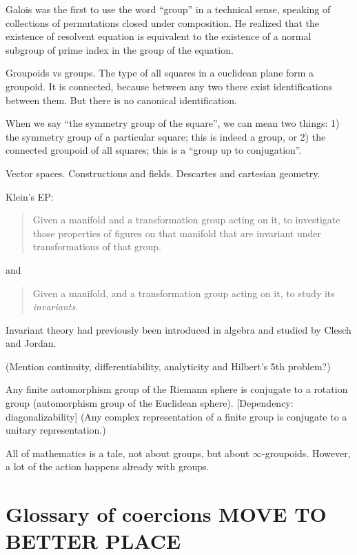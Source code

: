 Galois was the first to use the word ``group'' in a technical sense,
speaking of collections of permutations closed under composition.
He realized that the existence of resolvent equation is equivalent
to the existence of a normal subgroup of prime index
in the group of the equation.

Groupoids vs groups.
The type of all squares in a euclidean plane form a groupoid.
It is connected,
because between any two there exist identifications between them.
But there is no canonical identification.

When we say ``the symmetry group of the square'',
we can mean two things:
1) the symmetry group of a particular square;
this is indeed a group,
or 2) the connected groupoid of all squares;
this is a ``group up to conjugation''.

Vector spaces. Constructions and fields. Descartes and cartesian geometry.

Klein's EP:
\begin{quote}
  Given a manifold and a transformation group acting on it,
  to investigate those properties of figures on that manifold
  that are invariant under transformations of that group.
\end{quote}
and
\begin{quote}
  Given a manifold, and a transformation group acting on it,
  to study its \emph{invariants}.
\end{quote}
Invariant theory had previously been introduced in algebra
and studied by Clesch and Jordan.

(Mention continuity, differentiability, analyticity and Hilbert's 5th problem?)

Any finite automorphism group of the Riemann sphere is conjugate to a
rotation group (automorphism group of the Euclidean sphere).
[Dependency: diagonalizability] (Any complex representation of a
finite group is conjugate to a unitary representation.)


All of mathematics is a tale, not about groups,
but about $\infty$-groupoids.
However, a lot of the action happens already with groups.

\newpage

\section{Glossary of coercions MOVE TO BETTER PLACE}

